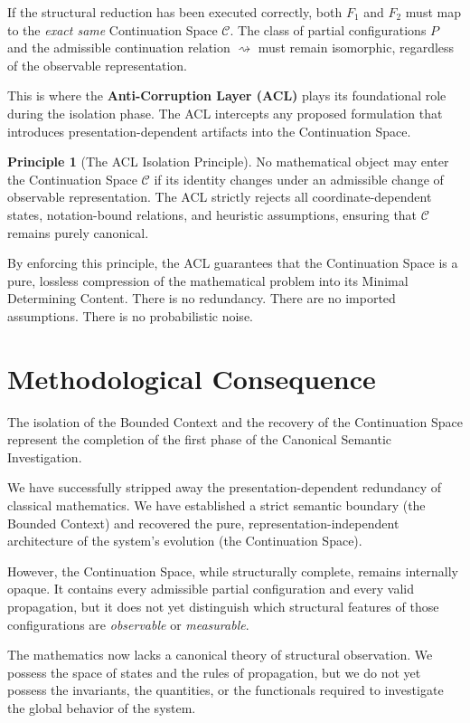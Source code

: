 \documentclass[12pt,openany]{extbook}
\theoremstyle{plain}
\theoremstyle{definition}
\newtheorem{principle}{Principle}[chapter]
\begin{document}
If the structural reduction has been executed correctly, both $F_1$ and $F_2$ must map to the \emph{exact same} Continuation Space $\mathcal{C}$. The class of partial configurations $P$ and the admissible continuation relation $\rightsquigarrow$ must remain isomorphic, regardless of the observable representation.

This is where the \textbf{Anti-Corruption Layer (ACL)} plays its foundational role during the isolation phase. The ACL intercepts any proposed formulation that introduces presentation-dependent artifacts into the Continuation Space. 

\begin{principle}[The ACL Isolation Principle]
No mathematical object may enter the Continuation Space $\mathcal{C}$ if its identity changes under an admissible change of observable representation. The ACL strictly rejects all coordinate-dependent states, notation-bound relations, and heuristic assumptions, ensuring that $\mathcal{C}$ remains purely canonical.
\end{principle}

By enforcing this principle, the ACL guarantees that the Continuation Space is a pure, lossless compression of the mathematical problem into its Minimal Determining Content. There is no redundancy. There are no imported assumptions. There is no probabilistic noise.

\section{Methodological Consequence}

The isolation of the Bounded Context and the recovery of the Continuation Space represent the completion of the first phase of the Canonical Semantic Investigation. 

We have successfully stripped away the presentation-dependent redundancy of classical mathematics. We have established a strict semantic boundary (the Bounded Context) and recovered the pure, representation-independent architecture of the system's evolution (the Continuation Space).

However, the Continuation Space, while structurally complete, remains internally opaque. It contains every admissible partial configuration and every valid propagation, but it does not yet distinguish which structural features of those configurations are \emph{observable} or \emph{measurable}. 

The mathematics now lacks a canonical theory of structural observation. We possess the space of states and the rules of propagation, but we do not yet possess the invariants, the quantities, or the functionals required to investigate the global behavior of the system.
\end{document}
